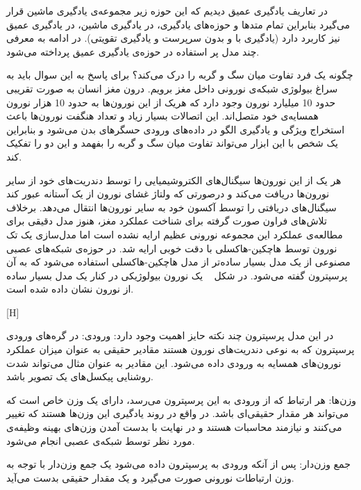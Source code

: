 در تعاریف یادگیری عمیق دیدیم که این حوزه زیر مجموعه‌ی یادگیری ماشین قرار می‌گیرد بنابراین تمام متدها و حوزه‌های یادگیری، در یادگیری ماشین، در یادگیری عمیق نیز کاربرد دارد (یادگیری با و بدون سرپرست و یادگیری تقویتی). در ادامه به معرفی چند مدل پر استفاده در حوزه‌ی یادگیری عمیق پرداخته می‌شود.

چگونه یک فرد تفاوت میان سگ و گربه را درک می‌کند؟ برای پاسخ به این سوال باید به سراغ بیولوژی شبکه‌ی نورونی داخل مغز برویم. درون مغز انسان به صورت تقریبی حدود 10 میلیارد نورون وجود دارد که هریک از این نورون‌ها به حدود 10 هزار نورون همسایه‌ی خود متصل‌اند. این اتصالات بسیار زیاد و تعداد هنگفت نورون‌ها باعث استخراج ویژگی و یادگیری الگو در داده‌های ورودی حسگرهای بدن می‌شود و بنابراین یک شخص با این ابزار می‌تواند تفاوت میان سگ و گربه را بفهمد و این دو را تفکیک کند.


هر یک از این نورون‌ها سیگنال‌های الکتروشیمیایی را توسط دندریت‌های خود از سایر نورون‌ها دریافت می‌کند و درصورتی که ولتاژ غشای نورون از یک آستانه عبور کند سیگنال‌های دریافتی را توسط آکسون خود به سایر نورون‌ها انتقال می‌دهد. برخلاف تلاش‌های فراون صورت گرفته برای شناخت عملکرد مغز، هنوز مدل دقیقی برای مطالعه‌ی عملکرد این مجموعه نورونی عظیم ارایه نشده است اما مدل‌سازی یک تک نورون توسط هاچکین-هاکسلی  با دقت خوبی ارایه شد. در حوزه‌ی شبکه‌های عصبی مصنوعی از یک مدل بسیار ساده‌تر از مدل هاچکین-هاکسلی استفاده می‌شود که به آن پرسپترون گفته می‌شود. در شکل ~ یک نورون بیولوژیکی در کنار یک مدل بسیار ساده از نورون نشان داده شده است.

[H]

در این مدل پرسپترون چند نکته حایز اهمیت وجود دارد:
 ورودی: در گره‌های ورودی پرسپترون که به نوعی دندریت‌های نورون هستند مقادیر حقیقی به عنوان میزان عملکرد نورون‌های همسایه به ورودی داده می‌شود. این مقادیر به عنوان مثال می‌تواند شدت روشنایی پیکسل‌های یک تصویر باشد.

 وزن‌ها: هر ارتباط که از ورودی به این پرسپترون می‌رسد، دارای یک وزن خاص است که می‌تواند هر مقدار حقیقی‌ای باشد. در واقع در روند یادگیری این وزن‌ها هستند که تغییر می‌کنند و نیازمند محاسبات هستند و در نهایت با بدست آمدن وزن‌های بهینه وظیفه‌ی مورد نظر توسط شبکه‌ی عصبی انجام می‌شود.

 جمع وزن‌دار: پس از آنکه ورودی به پرسپترون داده می‌شود یک جمع وزن‌دار با توجه به وزن ارتباطات نورونی صورت می‌گیرد و یک مقدار حقیقی بدست می‌آید.

